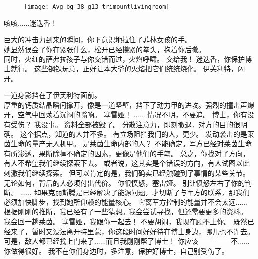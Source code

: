 \documentclass[openany]{book}
\begin{document}
\begin{figure}[h]
    \centering
    \texttt{[image: Avg\_bg\_38\_g13\_trimountlivingroom]}
\end{figure}
\begin{dialogue}
     咳咳......迷迭香！\par
    巨大的冲击力到来的瞬间，你下意识地拉住了菲林女孩的手。\\
    她显然误会了你在紧张什么，松开已经攥紧的拳头，抱着你后撤。\\
    同时，火红的萨弗拉孩子与你交错而过，火焰呼啸。
     交给我！
     迷迭香，你保护博士就行。
     这些钢铁玩意，正好让本大爷的火焰把它们统统烧化。
     伊芙利特，闪开。\par
    一道身影挡在了伊芙利特面前。\\
    厚重的钙质结晶瞬间撑开，像是一道坚壁，挡下了动力甲的进攻。强烈的撞击声爆开，空气中回荡着沉闷的嗡响。
     塞雷娅！
     ......
     情况不明，不要追。
     博士，你有没有受伤？
     我没事。
     资料全部被毁了。
     分散注意力，即刻撤退，对方的目的很明确。
     这个据点，知道的人并不多。
     有立场阻拦我们的人，更少。
     发动袭击的是莱茵生命的量产无人机甲。
     是莱茵生命内部的人？
     不能确定。军方已经对莱茵生命有所渗透，果断除掉不确定的因素，更像是他们的手笔。
     总之，你找对了方向，有人不希望我们继续探索下去。
     或者说，这其实是个错误的方向，有人试图以此刺激我们继续探索。
     但可以肯定的是，我们确实已经触碰到了事情的某些关节。
     无论如何，背后的人必须付出代价。
     你很愤怒，塞雷娅。
     别让愤怒左右了你的判断。
     ......
     如果克丽斯腾是已经解决了能源问题，才切断了与军方的联系，那我们必须加快脚步，找到她所仰赖的能量核心。
     它离军方控制的能量井不会太远......
     根据刚刚的推断，我已经有了一些猜想。我会尝试寻找，但还需要更多的资料。
     我会回一趟莱茵。
     塞雷娅，我跟你一起去！
     不要胡闹，我现在顾不上你。
     既然已经来了，暂时又没法离开特里蒙，你这段时间好好待在博士身边，哪儿也不许去。
     可是，敌人都已经找上门来了......而且我刚刚帮了博士！
     你应该——
     ——
     不......你做得很好。
     我不在你们身边时，多注意，保护好博士，自己别受伤了。
\end{dialogue}
\end{document}
